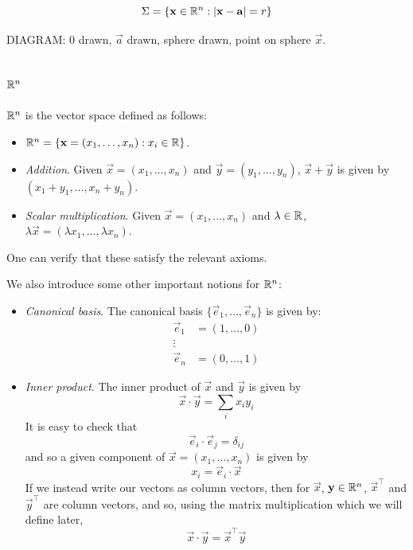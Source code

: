 \documentclass{../template/note}
\begin{document}
    \[
        \Sigma = \{\vec x \in \RR^n: |\vec x - \vec a| = r\}
    \]
    
    DIAGRAM: 0 drawn, \(\vec a\) drawn, sphere drawn, point on sphere \(\vec x\).

    \subsection{\(\mathbb R^n\)}

    \begin{definition}
        \(\mathbb R^n\) is the vector space defined as follows:
        \begin{itemize}
            \item \(\RR^n = \{\vec x = (x_1, \dots, x_n): x_i \in \RR\}\).
            \item \emph{Addition}. Given \(\vec x = (x_1, \dots, x_n)\) and \(\vec y = (y_1, \dots, y_n)\), \(\vec x + \vec y\) is given by \((x_1 + y_1, \dots, x_n + y_n)\).
            \item \emph{Scalar multiplication}. Given \(\vec x = (x_1, \dots, x_n)\) and \(\lambda \in \mathbb R\), \(\lambda \vec x = (\lambda x_1, \dots, \lambda x_n)\).
        \end{itemize}
        One can verify that these satisfy the relevant axioms.

        We also introduce some other important notions for \(\mathbb R^n\):
        \begin{itemize}
            \item \emph{Canonical basis}. The canonical basis \(\{\vec e_1, \dots, \vec e_n\}\) is given by:
            \begin{align*}
                \vec e_1 &= (1, \dots, 0) \\
                \vdots \\
                \vec e_n &= (0, \dots, 1)
            \end{align*}
            \item \emph{Inner product}. The inner product of \(\vec x\) and \(\vec y\) is given by
            \[
                \vec x \cdot \vec y = \sum_i x_iy_i
            \]
            It is easy to check that
            \[
                \vec e_i \cdot \vec e_j = \delta_{ij}
            \]
            and so a given component of \(\vec x = (x_1, \dots, x_n)\) is given by
            \[
                x_i = \vec e_i \cdot \vec x
            \]
            If we instead write our vectors as column vectors, then for \(\vec x\), \(\vec y \in \RR^n\), \(\vec x^\intercal\) and \(\vec y^\intercal\) are column vectors, and so, using the matrix multiplication which we will define later,
            \[
                \vec x \cdot \vec y = \vec x^\intercal \vec y
            \]
        \end{itemize}
    \end{definition}
    
\end{document}

